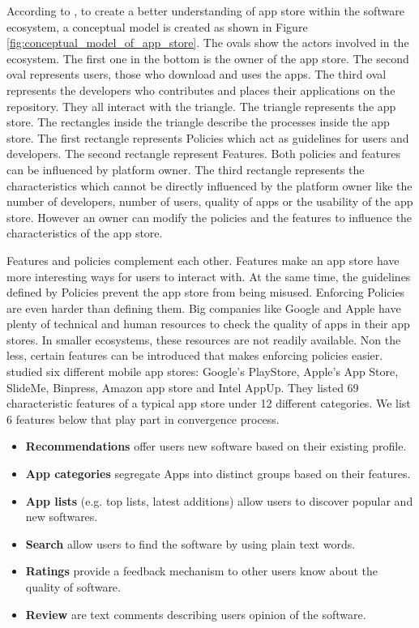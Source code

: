 According to \cite{Jansen}, to create a better understanding of app store within the software ecosystem, a conceptual model is created as shown in Figure \ref{fig:conceptual_model_of_app_store}. The ovals show the actors involved in the ecosystem. The first one in the bottom is the owner of the app store. The second oval represents users, those who download and uses the apps. The third oval represents the developers who contributes and places their applications on the repository. They all interact with the triangle. The triangle represents the app store. The rectangles inside the triangle describe the processes inside the app store. The first rectangle represents Policies which act as guidelines for users and developers. The second rectangle represent Features. Both policies and features can be influenced by platform owner. The third rectangle represents the characteristics which cannot be directly influenced by the platform owner like the number of developers, number of users, quality of apps or the usability of the app store. However an owner can modify the policies and the features to influence the characteristics of the app store.

Features and policies complement each other. Features make an app store have more interesting ways for users to interact with. At the same time, the guidelines defined by Policies prevent the app store from being misused. Enforcing Policies are even harder than defining them. Big companies like Google and Apple have plenty of technical and human resources to check the quality of apps in their app stores. In smaller ecosystems, these resources are not readily available. Non the less, certain features can be introduced that makes enforcing policies easier. \cite{Jansen} studied six different mobile app stores: Google's PlayStore, Apple's App Store, SlideMe, Binpress, Amazon app store and Intel AppUp. They listed 69 characteristic features of a typical app store under 12 different categories. We list 6 features below that play part in convergence process.

\begin{itemize}
  \item \textbf{Recommendations} offer users new software based on their existing profile.
  \item \textbf{App categories} segregate Apps into distinct groups based on their features.
  \item \textbf{App lists} (e.g. top lists, latest additions) allow users to discover popular and new softwares.
  \item \textbf{Search} allow users to find the software by using plain text words.
  \item \textbf{Ratings} provide a feedback mechanism to other users know about the quality of software.
  \item \textbf{Review} are text comments describing users opinion of the software.
\end{itemize}

